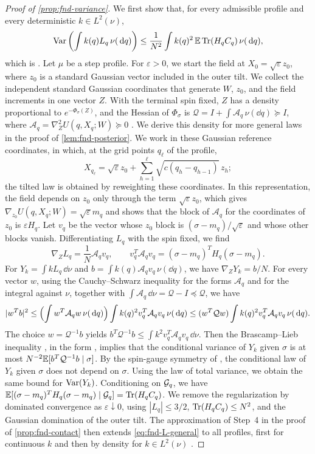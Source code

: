 \begin{proof}[Proof of \cref{prop:fnd-variance}]
We first show that, for every admissible profile and every deterministic
$k\in L^2(\nu)$,
\begin{equation}\label{eq:fnd-L-general}
 \operatorname{Var}\left(\int k(q)L_q\,\nu(\,\mathrm d q)\right)
 \le\frac1{N^2}\int k(q)^2\,\mathbb E\operatorname{Tr}(H_qC_q)\,\nu(\,\mathrm d q),
\end{equation}
which is \cite[(2.15)]{AL}. Let $\mu$ be a step profile. For
$\varepsilon>0$, we start the field at $X_0=\sqrt\varepsilon z_0$, where
$z_0$ is a standard Gaussian vector included in the outer tilt. We
collect the independent standard Gaussian coordinates that generate $W$,
$z_0$, and the field increments in one vector $Z$. With the terminal spin
fixed, $Z$ has a density proportional to $e^{-\Phi_\sigma(Z)}$, and the
Hessian of $\Phi_\sigma$ is
$\mathcal Q=I+\int\mathcal A_q\,\nu(\dd q)\succeq I$, where
$\mathcal A_q=\nabla_Z^2U(q,X_q;W)\succeq0$ \cite[(2.1)--(2.3)]{AL}. We
derive this density for more general laws in the proof of
\cref{lem:fnd-posterior}. We work in these Gaussian reference
coordinates, in which, at the grid points $q_\ell$ of the profile,
\[
 X_{q_\ell}=\sqrt\varepsilon z_0
   +\sum_{h=1}^{\ell}\sqrt{c(q_h-q_{h-1})}\,z_h ;
\]
the tilted law is obtained by reweighting these coordinates. In this
representation, the field depends on $z_0$ only through the term
$\sqrt\varepsilon z_0$, which gives
$\nabla_{z_0}U(q,X_q;W)=\sqrt\varepsilon m_q$ and shows that
the block of
$\mathcal A_q$ for the coordinates of $z_0$ is $\varepsilon H_q$. Let $v_q$ be the vector whose $z_0$ block is
$(\sigma-m_q)/\sqrt\varepsilon$ and whose other blocks vanish.
Differentiating $L_q$ with the spin fixed, we find
\[
 \nabla_ZL_q=\frac1N\mathcal A_qv_q,\qquad
 v_q^T\mathcal A_qv_q=(\sigma-m_q)^TH_q(\sigma-m_q).
\]
For $Y_k=\int kL_q\,\dd\nu$ and $b=\int k(q)\mathcal A_qv_q\,\nu(\dd q)$,
we have $\nabla_ZY_k=b/N$. For every vector $w$, using the Cauchy--Schwarz
inequality for the forms $\mathcal A_q$ and for the integral against
$\nu$, together with $\int\mathcal A_q\,\dd\nu=\mathcal Q-I\preceq\mathcal Q$,
we have
\[
 |w^Tb|^2\le\Bigl(\int w^T\mathcal A_qw\,\nu(\,\mathrm d q)\Bigr)
       \int k(q)^2v_q^T\mathcal A_qv_q\,\nu(\,\mathrm d q)
 \le(w^T\mathcal Qw)\int k(q)^2v_q^T\mathcal A_qv_q\,\nu(\,\mathrm d q).
\]
The choice $w=\mathcal Q^{-1}b$ yields
$b^T\mathcal Q^{-1}b\le\int k^2v_q^T\mathcal A_qv_q\,\dd\nu$. Then the
Brascamp--Lieb inequality \cite{BrascampLieb1976}, in the form
\cite[Proposition~2.2, (2.14)]{AL}, implies that the conditional variance
of $Y_k$ given $\sigma$ is at most
$N^{-2}\mathbb E[b^T\mathcal Q^{-1}b\mid\sigma]$. By the
spin-gauge symmetry of \cite[Section~2.1]{AL}, the conditional law of
$Y_k$ given $\sigma$ does not depend on $\sigma$. Using the law of total
variance, we obtain the same bound for $\operatorname{Var}(Y_k)$. Conditioning on $\mathcal G_q$,
we have
$\mathbb E[(\sigma-m_q)^TH_q(\sigma-m_q)\mid\mathcal G_q]=\operatorname{Tr}(H_qC_q)$. We remove the
regularization by dominated convergence as
$\varepsilon\downarrow0$, using $|L_q|\le3/2$, $\operatorname{Tr}(H_qC_q)\le N^2$, and
the Gaussian domination of the outer tilt. The approximation of Step~4 in
the proof of \cref{prop:fnd-contact} then extends \eqref{eq:fnd-L-general} to all
profiles, first for continuous $k$ and then by density for
$k\in L^2(\nu)$ \cite[Section~2.6.2]{AL}.


\end{proof}
